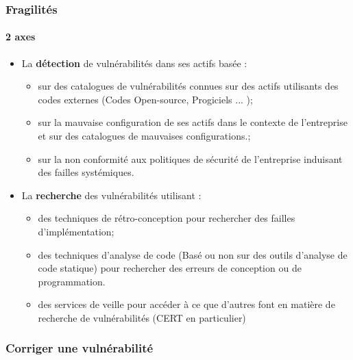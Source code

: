 \begin{frame}
\frametitle<presentation>{Fragilités}
\framesubtitle<presentation>{2 axes}
\begin{itemize}
  \item La \textbf{détection} de vulnérabilités dans ses actifs basée :
	\begin{itemize}
		  \item sur des catalogues de vulnérabilités connues sur des actifs  utilisants des codes externes (Codes Open-source, Progiciels ... ); 
 		 \item  sur la mauvaise configuration de ses actifs dans le contexte de l'entreprise et sur des catalogues de mauvaises configurations.;
		  \item  sur la non conformité aux politiques de sécurité de l'entreprise induisant des failles systémiques.
		\end{itemize}
 \item La \textbf{recherche} des vulnérabilités utilisant :
\begin{itemize}
		\item	des techniques de rétro-conception pour rechercher des failles d'implémentation;
		\item	des techniques d'analyse de code (Basé ou non sur des outils d'analyse de code statique) pour rechercher des erreurs de conception ou de programmation.
		\item	des services de veille  pour accéder à ce que d'autres font en matière de recherche de vulnérabilités (CERT en particulier)
\end{itemize}
\end{itemize}
\end{frame}





\begin{frame}
\frametitle<presentation>{Corriger une vulnérabilité}
\end{frame}



